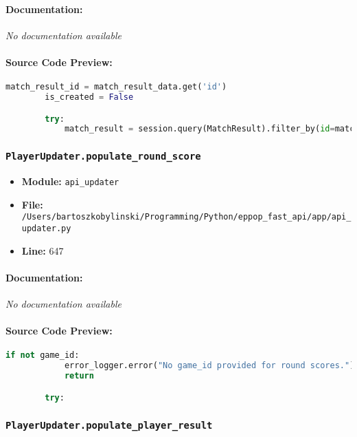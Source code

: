\documentclass[11pt,a4paper]{article}
\begin{document}
\paragraph{Documentation:} \textit{No documentation available}

\paragraph{Source Code Preview:}
\begin{lstlisting}[language=Python]
        match_result_id = match_result_data.get('id')
        is_created = False

        try:
            match_result = session.query(MatchResult).filter_by(id=match_result_id).one_or_none()
\end{lstlisting}

\vspace{1em}
\subsubsection{\texttt{PlayerUpdater.populate\_round\_score}}

\begin{itemize}
    \item \textbf{Module:} \texttt{api\_updater}
    \item \textbf{File:} \texttt{/Users/bartoszkobylinski/Programming/Python/eppop\_fast\_api/app/api\_updater.py}
    \item \textbf{Line:} 647
\end{itemize}

\paragraph{Documentation:} \textit{No documentation available}

\paragraph{Source Code Preview:}
\begin{lstlisting}[language=Python]
        if not game_id:
            error_logger.error("No game_id provided for round scores.")
            return

        try:
\end{lstlisting}

\vspace{1em}
\subsubsection{\texttt{PlayerUpdater.populate\_player\_result}}
\end{document}
